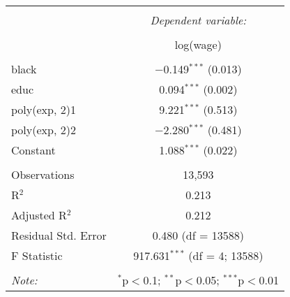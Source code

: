 
\begin{tabular}{@{\extracolsep{5pt}}lc} 
\\[-1.8ex]\hline 
\hline \\[-1.8ex] 
 & \multicolumn{1}{c}{\textit{Dependent variable:}} \\ 
\cline{2-2} 
\\[-1.8ex] & log(wage) \\ 
\hline \\[-1.8ex] 
 black & $-$0.149$^{***}$ (0.013) \\ 
  educ & 0.094$^{***}$ (0.002) \\ 
  poly(exp, 2)1 & 9.221$^{***}$ (0.513) \\ 
  poly(exp, 2)2 & $-$2.280$^{***}$ (0.481) \\ 
  Constant & 1.088$^{***}$ (0.022) \\ 
 \hline \\[-1.8ex] 
Observations & 13,593 \\ 
R$^{2}$ & 0.213 \\ 
Adjusted R$^{2}$ & 0.212 \\ 
Residual Std. Error & 0.480 (df = 13588) \\ 
F Statistic & 917.631$^{***}$ (df = 4; 13588) \\ 
\hline 
\hline \\[-1.8ex] 
\textit{Note:}  & \multicolumn{1}{r}{$^{*}$p$<$0.1; $^{**}$p$<$0.05; $^{***}$p$<$0.01} \\ 
\end{tabular} 
